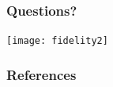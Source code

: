 \documentclass{beamer}
\begin{document}
\begin{frame}
  \frametitle{Questions?}
\begin{center}
  \texttt{[image: fidelity2]}
\end{center}
\end{frame}

\begin{frame}
  \frametitle{References}


\end{frame}

\end{document}
